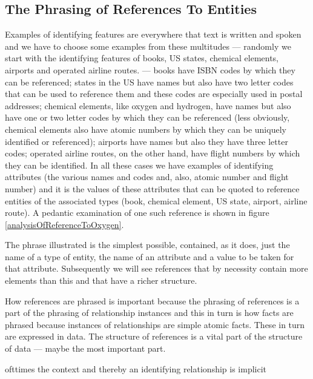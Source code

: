 \subsection{The Phrasing of References To Entities}
\mynote
Examples of identifying features are everywhere that text is written and spoken and we have to choose some examples from these multitudes
--- randomly we start with the identifying features of books, US states, chemical elements, airports and operated airline routes. 
--- books have ISBN codes by which they can be referenced; 
states in the US have names but also have two letter codes that can be used to reference them and these codes are especially used in postal addresses; chemical elements, like oxygen and hydrogen, have names but also have one or two letter codes by which they can be referenced
(less obviously, chemical elements also have atomic numbers by which they can be uniquely identified or referenced); airports have names but also they have three letter codes; operated airline routes, on the other hand, 
have flight numbers by which they can be identified.
In all these cases we have examples of identifying attributes (the various names and codes and, also, atomic number and flight number) 
and it is the values of these attributes that can be quoted to reference entities of the associated types
(book, chemical element, US state, airport, airline route). A pedantic examination of one such reference is shown in figure \ref{analysisOfReferenceToOxygen}.

The phrase illustrated is the simplest possible, contained, as it does, just the name of a type of entity, the name of an attribute and a value to be taken for that attribute. Subsequently we will see references that by necessity contain more elements than this and that have a richer structure.

\begin{notebox}
How references are phrased is important because the phrasing of references is a part of the phrasing of relationship instances and this in turn is how facts are phrased because instances of relationships are simple atomic facts. These in turn are expressed in data. The structure of references is a vital part of the structure of data --- maybe the most important part.
\end{notebox}

\begin{notebox}
ofttimes the context and thereby an identifying relationship is implicit
\end{notebox}

